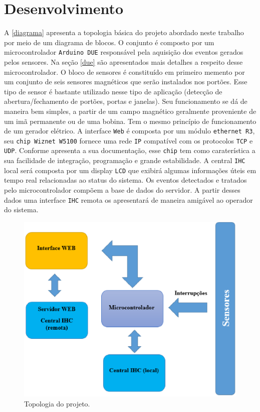 \chapter[Desenvolvimento]{Desenvolvimento}


A \autoref{diagrama} apresenta a topologia básica do projeto abordado neste trabalho por meio de um diagrama de blocos. 
O conjunto é composto por um microcontrolador \texttt{Arduino DUE} responsável pela aquisição dos eventos gerados pelos sensores.
Na seção \ref{due} são apresentados mais detalhes a respeito desse microcontrolador. O bloco de sensores é constituído em primeiro memento 
por um conjunto de seis sensores magnéticos que serão instalados nos portões. Esse tipo de sensor é bastante utilizado nesse tipo de aplicação
(detecção de abertura/fechamento de portões, portas e janelas). Seu funcionamento se dá de maneira bem simples, a partir de um campo magnético 
geralmente proveniente de um imã permanente ou de uma bobina. Tem o mesmo princípio de funcionamento de um gerador elétrico. A interface \texttt{Web} é 
composta por um módulo \texttt{ethernet R3}, seu \texttt{chip Wiznet W5100} fornece uma rede \texttt{IP} compatível com os protocolos \texttt{TCP} e \texttt{UDP}. Conforme apresenta a sua
documentação, esse \texttt{chip} tem como caraterística a sua facilidade de integração, programação e grande estabilidade. A central \texttt{IHC} local será composta
por um display \texttt{LCD} que exibirá algumas informações úteis em tempo real relacionadas ao status do sistema. Os eventos detectados e tratados pelo
microcontrolador compõem a base de dados do servidor.  A partir desses dados uma interface \texttt{IHC} remota os apresentará de maneira amigável ao operador
do sistema. 

\begin{figure}[h]
	\centering
	\caption{\label{diagrama}Topologia do projeto.}
		\includegraphics[keepaspectratio=true,scale=0.7]{figuras/diagrama.eps}
\end{figure}


